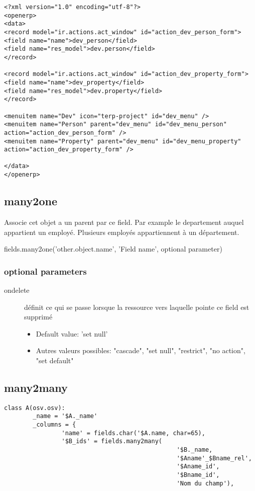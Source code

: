 \documentclass[12pt,a4paper]{article}
\begin{document}
\begin{verbatim}
<?xml version="1.0" encoding="utf-8"?>
<openerp>
<data>
<record model="ir.actions.act_window" id="action_dev_person_form">
<field name="name">dev_person</field>
<field name="res_model">dev.person</field>
</record>

<record model="ir.actions.act_window" id="action_dev_property_form">
<field name="name">dev_property</field>
<field name="res_model">dev.property</field>
</record>

<menuitem name="Dev" icon="terp-project" id="dev_menu" />
<menuitem name="Person" parent="dev_menu" id="dev_menu_person" action="action_dev_person_form" />
<menuitem name="Property" parent="dev_menu" id="dev_menu_property" action="action_dev_property_form" />

</data>
</openerp>
\end{verbatim}

\subsection{many2one}
\label{sec:many2one}
Associe cet objet a un parent par ce field. Par example le departement auquel appartient un employé. Plusieurs employés appartiennent à un département.

fields.many2one('other.object.name', 'Field name', optional parameter)

\subsubsection{optional parameters}
\label{sec:optional_par}
\begin{description}
\item[ondelete] définit ce qui se passe lorsque la ressource vers laquelle pointe ce field est supprimé
  \begin{itemize}
    \item Default value: 'set null'
    \item Autres valeurs possibles: "cascade", "set null", "restrict", "no action", "set default"
  \end{itemize}

\end{description}


\subsection{many2many}
\label{sec:m2m}
\begin{verbatim}
class A(osv.osv):
        _name = '$A._name'
        _columns = {
                'name' = fields.char('$A.name, char=65),
                '$B_ids' = fields.many2many(
                                                '$B._name,
                                                '$Aname'_$Bname_rel',
                                                '$Aname_id',
                                                '$Bname_id',
                                                'Nom du champ'),
\end{verbatim}
\end{document}
